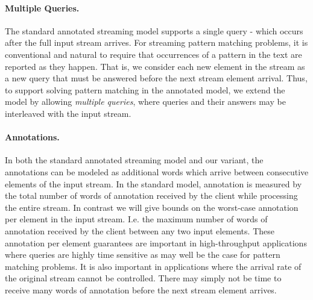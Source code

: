 \paragraph{Multiple Queries.} The standard annotated streaming model supports a single query - which occurs after the full input stream arrives. %
For streaming pattern matching problems, it is conventional and natural to require that occurrences of a pattern in the text are reported as they happen. That is, we consider each new element in the stream as a new query that must be answered before the next stream element arrival.
Thus, to support solving pattern matching in the annotated model, we extend the model by allowing \emph{multiple queries}, where queries and their answers may be interleaved with the input stream. 

\paragraph{Annotations.} In both the standard annotated streaming model and our variant, the annotations can be modeled as additional words which arrive between consecutive elements of the input stream. In the standard model, annotation is measured by the total number of words of annotation received by the client while processing the entire stream. In contrast we will give bounds on the worst-case annotation per element in the input stream. I.e. the maximum number of words of annotation received by the client between any two input elements. These annotation per element guarantees are important in high-throughput applications where queries are highly time sensitive as may well be the case for pattern matching problems. It is also important in applications where the arrival rate of the original stream cannot be controlled. There may simply not be time to receive many words of annotation before the next stream element arrives.

